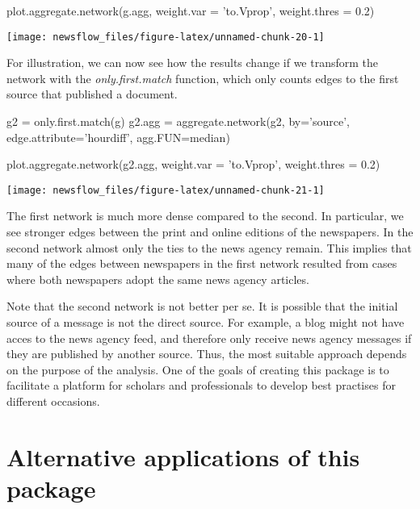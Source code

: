 \begin{Schunk}
\begin{Sinput}
plot.aggregate.network(g.agg, weight.var = 'to.Vprop',
                       weight.thres = 0.2)
\end{Sinput}


\begin{center}\texttt{[image: newsflow\_files/figure-latex/unnamed-chunk-20-1]} \end{center}

\end{Schunk}

For illustration, we can now see how the results change if we transform
the network with the \emph{only.first.match} function, which only counts
edges to the first source that published a document.

\begin{Schunk}
\begin{Sinput}
g2 = only.first.match(g)
g2.agg = aggregate.network(g2, by='source', edge.attribute='hourdiff', agg.FUN=median)

plot.aggregate.network(g2.agg, weight.var = 'to.Vprop',
                       weight.thres = 0.2)
\end{Sinput}


\begin{center}\texttt{[image: newsflow\_files/figure-latex/unnamed-chunk-21-1]} \end{center}

\end{Schunk}

The first network is much more dense compared to the second. In
particular, we see stronger edges between the print and online editions
of the newspapers. In the second network almost only the ties to the
news agency remain. This implies that many of the edges between
newspapers in the first network resulted from cases where both
newspapers adopt the same news agency articles.

Note that the second network is not better per se. It is possible that
the initial source of a message is not the direct source. For example, a
blog might not have acces to the news agency feed, and therefore only
receive news agency messages if they are published by another source.
Thus, the most suitable approach depends on the purpose of the analysis.
One of the goals of creating this package is to facilitate a platform
for scholars and professionals to develop best practises for different
occasions.

\section{Alternative applications of this package}

